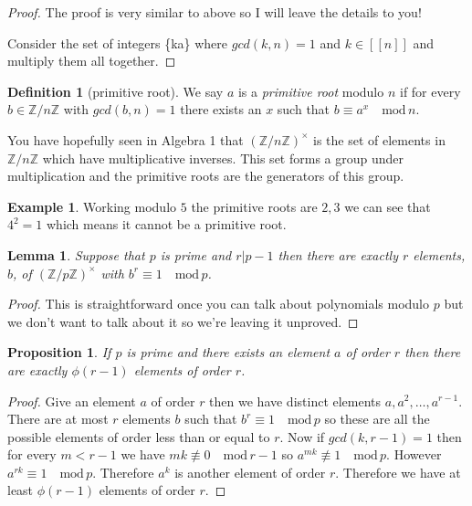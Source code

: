 \documentclass[
]{book}
\newtheorem{lemma}{Lemma}[chapter]
\newtheorem{proposition}{Proposition}[chapter]
\theoremstyle{definition}
\newtheorem{definition}{Definition}[chapter]
\theoremstyle{definition}
\newtheorem{example}{Example}[chapter]
\theoremstyle{definition}
\theoremstyle{definition}
\theoremstyle{remark}
\begin{document}
\begin{proof}
The proof is very similar to above so I will leave the details to you!

Consider the set of integers \{ka\} where \(gcd(k,n) =1\) and \(k \in [[n]]\) and multiply them all together.
\end{proof}

\begin{definition}[primitive root]
We say \(a\) is a \emph{primitive root} modulo \(n\) if for every \(b \in \mathbb{Z}/n\mathbb{Z}\) with \(gcd(b,n)=1\) there exists an \(x\) such that \(b \equiv a^x \quad \mbox{mod}\, n\).
\end{definition}

You have hopefully seen in Algebra 1 that \((\mathbb{Z}/n\mathbb{Z})^{\times}\) is the set of elements in \(\mathbb{Z}/n\mathbb{Z}\) which have multiplicative inverses. This set forms a group under multiplication and the primitive roots are the generators of this group.

\begin{example}
Working modulo \(5\) the primitive roots are \(2,3\) we can see that \(4^2 = 1\) which means it cannot be a primitive root.
\end{example}

\begin{lemma}
Suppose that \(p\) is prime and \(r|p-1\) then there are exactly \(r\) elements, \(b\), of \(\left(\mathbb{Z}/p\mathbb{Z} \right)^{\times}\) with \(b^r \equiv 1 \quad \mbox{mod}\, p\).
\end{lemma}

\begin{proof}
This is straightforward once you can talk about polynomials modulo \(p\) but we don't want to talk about it so we're leaving it unproved.
\end{proof}

\begin{proposition}
If \(p\) is prime and there exists an element \(a\) of order \(r\) then there are exactly \(\phi(r-1)\) elements of order \(r\).
\end{proposition}

\begin{proof}
Give an element \(a\) of order \(r\) then we have distinct elements \(a, a^2, \dots, a^{r-1}\). There are at most \(r\) elements \(b\) such that \(b^r \equiv 1 \quad \mbox{mod}\, p\) so these are all the possible elements of order less than or equal to \(r\). Now if \(gcd(k,r-1) = 1\) then for every \(m < r-1\) we have \(mk \not\equiv 0 \quad \mbox{mod} \, r-1\) so \(a^{mk} \not\equiv 1 \quad \mbox{mod} \, p\). However \(a^{rk} \equiv 1 \quad \mbox{mod} \, p\). Therefore \(a^k\) is another element of order \(r\). Therefore we have at least \(\phi(r-1)\) elements of order \(r\).
\end{proof}
\end{document}
